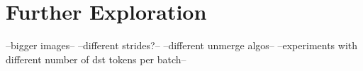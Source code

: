 \section{Further Exploration}
--bigger images--
--different strides?--
--different unmerge algos--
--experiments with different number of dst tokens per batch--